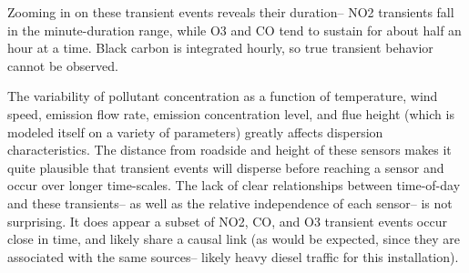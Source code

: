 Zooming in on these transient events reveals their duration-- NO2 transients fall in the minute-duration range, while O3 and CO tend to sustain for about half an hour at a time.  Black carbon is integrated hourly, so true transient behavior cannot be observed.  

The variability of pollutant concentration as a function of temperature, wind speed, emission flow rate, emission concentration level,  and flue height (which is modeled itself on a variety of parameters) greatly affects dispersion characteristics.  The distance from roadside and height of these sensors makes it quite plausible that transient events will disperse before reaching a sensor and occur over longer time-scales. \cite{kaur2007}  The lack of clear relationships between time-of-day and these transients-- as well as the relative independence of each sensor-- is not surprising.  It does appear a subset of NO2, CO, and O3 transient events occur close in time, and likely share a causal link (as would be expected, since they are associated with the same sources-- likely heavy diesel traffic for this installation).  



